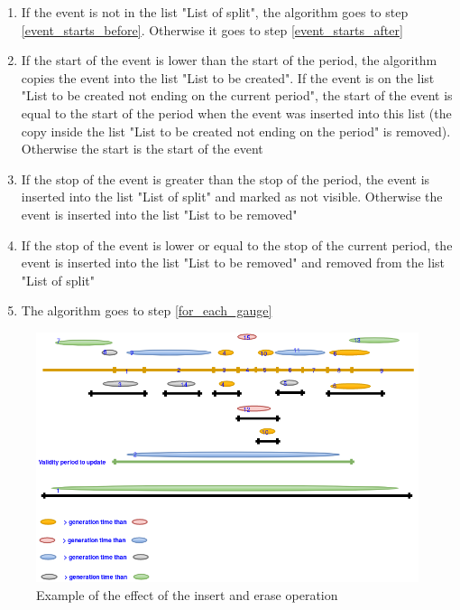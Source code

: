 \begin{enumerate}
\item If the event is not in the list "List of split", the algorithm goes to step \ref{event_starts_before}. Otherwise it goes to step \ref{event_starts_after}
\item \label{event_starts_before} If the start of the event is lower than the start of the period, the algorithm copies the event into the list "List to be created". If the event is on the list "List to be created not ending on the current period", the start of the event is equal to the start of the period when the event was inserted into this list (the copy inside the list "List to be created not ending on the period" is removed). Otherwise the start is the start of the event
\item If the stop of the event is greater than the stop of the period, the event is inserted into the list "List of split" and marked as not visible. Otherwise the event is inserted into the list "List to be removed"
\item \label{event_starts_after} If the stop of the event is lower or equal to the stop of the current period, the event is inserted into the list "List to be removed" and removed from the list "List of split"
\item The algorithm goes to step \ref{for_each_gauge}
\end{enumerate}

\begin{figure}[H]
  \begin{center}
	\centering\includegraphics[width=150mm]{../fig/insert_and_erase_algorithm.png}
	\caption{Example of the effect of the insert and erase operation}
	\label{fg:insert_and_erase_algorithm}
  \end{center}
\end{figure}

